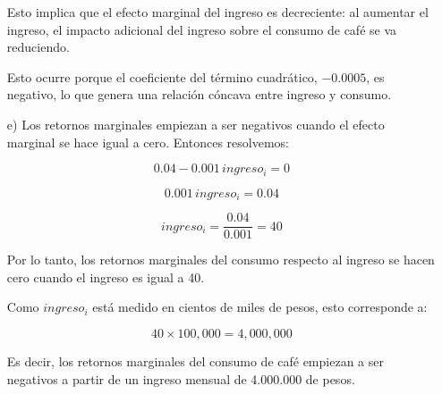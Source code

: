 \documentclass[12pt]{article}
\begin{document}
\begin{enumerate}
    Esto implica que el efecto marginal del ingreso es decreciente: al aumentar el ingreso, el impacto adicional del ingreso sobre el consumo de café se va reduciendo.

    Esto ocurre porque el coeficiente del término cuadrático, $-0.0005$, es negativo, lo que genera una relación cóncava entre ingreso y consumo.

    \item[e)] Los retornos marginales empiezan a ser negativos cuando el efecto marginal se hace igual a cero. Entonces resolvemos:

    \[
    0.04 - 0.001\,ingreso_i = 0
    \]

    \[
    0.001\,ingreso_i = 0.04
    \]

    \[
    ingreso_i = \frac{0.04}{0.001} = 40
    \]

    Por lo tanto, los retornos marginales del consumo respecto al ingreso se hacen cero cuando el ingreso es igual a 40.

    Como $ingreso_i$ está medido en cientos de miles de pesos, esto corresponde a:

    \[
    40 \times 100{,}000 = 4{,}000{,}000
    \]

    Es decir, los retornos marginales del consumo de café empiezan a ser negativos a partir de un ingreso mensual de 4.000.000 de pesos.
\end{enumerate}
\end{document}
